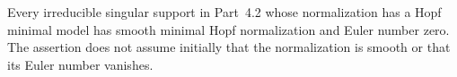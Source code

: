 
\begin{proposition}[P4.36]\hypertarget{tag-02X9}{}\label{night:P4.36}\label{stmt:P4.36}


Every irreducible singular support in Part~4.2 whose
normalization has a Hopf minimal model has smooth minimal
Hopf normalization and Euler number zero. The assertion
does not assume initially that the normalization is smooth
or that its Euler number vanishes.
\end{proposition}

